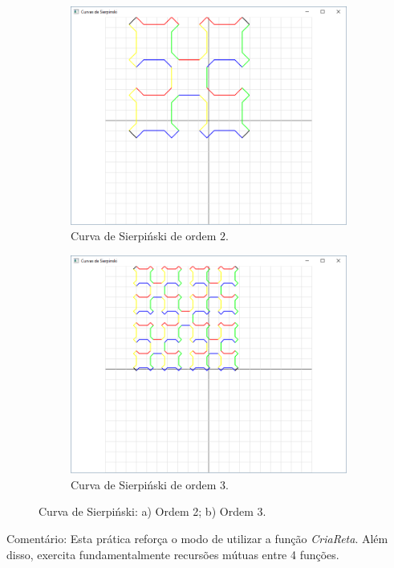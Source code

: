 \begin{renumerate}
  \begin{figure}[!htp]
          \centering
          \begin{subfigure}[t]{0.45\textwidth}
              \centerline{\includegraphics[width=.9\textwidth]{img/cap4_ex16b}}
              \caption{Curva de Sierpiński de ordem $2$.}
              \label{fig:cap03_ex14a}
          \end{subfigure}
          \hfill
          \begin{subfigure}[t]{0.45\textwidth}
              \centerline{\includegraphics[width=.9\textwidth]{img/cap4_ex16c}}
              \caption{Curva de Sierpiński de ordem $3$.}
              \label{fig:cap03_ex14b}
          \end{subfigure}
          
          \caption{
            \label{fig:koch}%
            Curva de Sierpiński: a) Ordem 2; b) Ordem 3.
          }

        \end{figure}
  Comentário: Esta prática reforça o modo de utilizar a função \emph{CriaReta}. Além disso, exercita fundamentalmente recursões mútuas entre 4 funções.
%
  
\end{renumerate}
